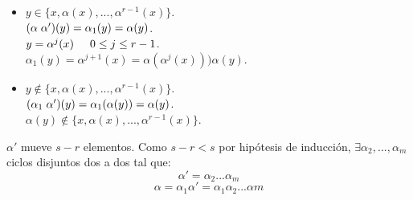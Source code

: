 \documentclass[11pt,a4paper]{article}
\begin{document}
\begin{enumerate*}
\begin{itemize}
\item $y \in \{x, \alpha(x), ..., \alpha^{r-1}(x)\}$. \\
$(\alpha \hspace{0.1cm} \alpha')(y) = \alpha_{1}(y) = \alpha(y)$. \\
$y = \alpha^{j}(x) \hspace{0.5cm} 0 \leq j \leq r-1$. \\
$\alpha_{1}(y) = \alpha^{j+1}(x) = \alpha(\alpha^{j}(x)) ) \alpha(y)$.
\item $y \notin \{x, \alpha(x), ..., \alpha^{r-1}(x)\}$. \\
$(\alpha_{1} \hspace{0.1cm} \alpha')(y) = \alpha_{1}(\alpha(y)) = \alpha(y)$. \\
$\alpha(y) \notin \{x, \alpha(x), ..., \alpha^{r-1}(x)\}$.
\end{itemize}
$\alpha'$ mueve $s-r$ elementos. Como $s-r < s$ por hipótesis de inducción, $\exists \alpha_{2}, ..., \alpha_{m}$ ciclos disjuntos dos a dos tal que:
$$\alpha' = \alpha_{2} ... \alpha_{m}$$
$$\alpha = \alpha_{1}\alpha' = \alpha_{1} \alpha_{2} ... \alpha{m}$$


\end{enumerate*}
\end{document}
